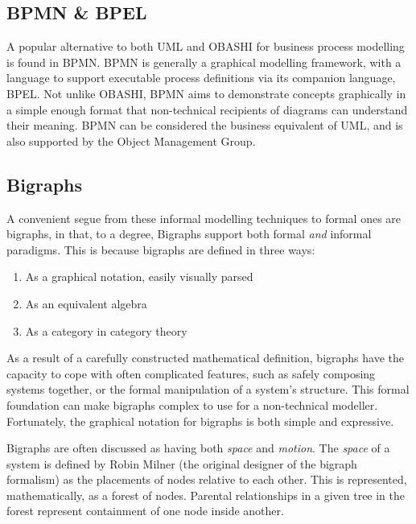 \documentclass{article}
\begin{document}
\subsection{BPMN \& BPEL}
\label{subsec:bpmn}
A popular alternative to both UML and OBASHI for business process modelling is
found in BPMN\cite{bpmn_intro}. BPMN is generally a graphical modelling
framework, with a language to support executable process definitions via its
companion language, BPEL\cite{bpel_1.1_spec}. Not unlike OBASHI, BPMN aims to
demonstrate concepts graphically in a simple enough format that non-technical
recipients of diagrams can understand their meaning. BPMN can be considered the
business equivalent of UML, and is also supported by the Object Management
Group.\par


\subsection{Bigraphs}
\label{subsubsec:bigraphs}
A convenient segue from these informal modelling techniques to formal ones are
bigraphs, in that, to a degree, Bigraphs support both formal \emph{and} informal
paradigms. This is because bigraphs are defined in three ways:

\begin{enumerate}
\item As a graphical notation, easily visually parsed
\item As an equivalent algebra
\item As a category in category theory
\end{enumerate}

As a result of a carefully constructed mathematical definition, bigraphs have
the capacity to cope with often complicated features, such as safely composing
systems together, or the formal manipulation of a system's structure. This
formal foundation can make bigraphs complex to use for a non-technical
modeller. Fortunately, the graphical notation for bigraphs is both simple and
expressive.\par

Bigraphs are often discussed as having both \emph{space} and
\emph{motion}\cite{milner2009space}. The \emph{space} of a system is defined by
Robin Milner (the original designer of the bigraph formalism) as the placements
of nodes relative to each other. This is represented, mathematically, as a
forest of nodes. Parental relationships in a given tree in the forest represent
containment of one node inside another.\par
\end{document}
